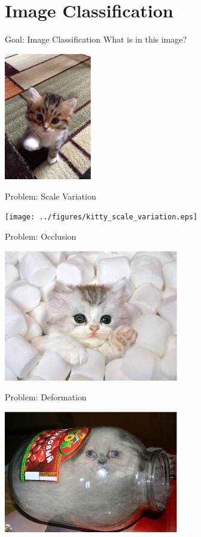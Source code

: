 \documentclass{beamer}
\begin{document}
  \section{Image Classification}
  \begin{frame}{Goal: Image Classification}
     What is in this image?\\
    \begin{center}
      \includegraphics[width=1.5in]{../figures/kitty.eps}
    \end{center}
  \end{frame}

  \begin{frame}{Problem: Scale Variation}
    \begin{center}
      \texttt{[image: ../figures/kitty\_scale\_variation.eps]}
    \end{center}
  \end{frame}

  \begin{frame}{Problem: Occlusion}
    \begin{center}
      \includegraphics[width=3in]{../figures/kitty_occlusion.eps}
    \end{center}
  \end{frame}

  \begin{frame}{Problem: Deformation}
    \begin{center}
      \includegraphics[width=3in]{../figures/cat_deformed.eps}
    \end{center}
  \end{frame}
\end{document}
